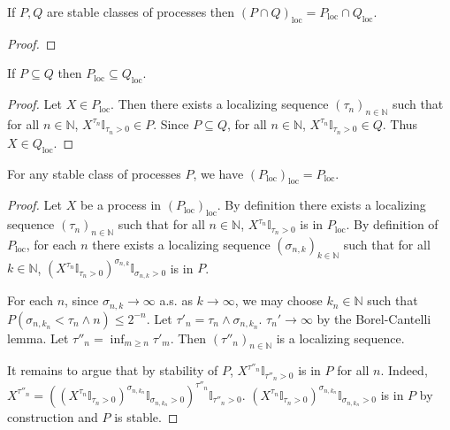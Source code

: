 \begin{lemma}\label{lem:locally_inter}
  \leanok
If $P, Q$ are stable classes of processes then $(P\cap Q)_{\mathrm{loc}} = P_{\mathrm{loc}}\cap Q_{\mathrm{loc}}$.
\end{lemma}

\begin{proof}

\end{proof}


\begin{lemma}\label{lem:locally_mono}
  \leanok
If $P \subseteq Q$ then $P_{\mathrm{loc}} \subseteq Q_{\mathrm{loc}}$.
\end{lemma}

\begin{proof}
Let $X \in P_{\mathrm{loc}}$.
Then there exists a localizing sequence $(\tau_n)_{n \in \mathbb{N}}$ such that for all $n \in \mathbb{N}$, $X^{\tau_n}\mathbb{I}_{\tau_n > 0} \in P$.
Since $P \subseteq Q$, for all $n \in \mathbb{N}$, $X^{\tau_n}\mathbb{I}_{\tau_n > 0} \in Q$.
Thus $X \in Q_{\mathrm{loc}}$.
\end{proof}


\begin{lemma}\label{lem:locally_locally}
  \leanok
For any stable class of processes $P$, we have $(P_{\mathrm{loc}})_{\mathrm{loc}} = P_{\mathrm{loc}}$.
\end{lemma}

\begin{proof}
Let $X$ be a process in $(P_{\mathrm{loc}})_{\mathrm{loc}}$.
By definition there exists a localizing sequence $(\tau_n)_{n \in \mathbb{N}}$ such that for all $n \in \mathbb{N}$, $X^{\tau_n}\mathbb{I}_{\tau_n > 0}$ is in $P_{\mathrm{loc}}$.
By definition of $P_{\mathrm{loc}}$, for each $n$ there exists a localizing sequence $(\sigma_{n,k})_{k \in \mathbb{N}}$ such that for all $k \in \mathbb{N}$, $(X^{\tau_n}\mathbb{I}_{\tau_n > 0})^{\sigma_{n,k}}\mathbb{I}_{\sigma_{n,k} > 0}$ is in $P$.

For each $n$, since $\sigma_{n,k} \to \infty$ a.s. as $k \to \infty$, we may choose $k_n \in \mathbb{N}$ such that $P(\sigma_{n,k_n} < \tau_n \wedge n) \le 2^{-n}$.
Let $\tau'_n = \tau_n \wedge \sigma_{n,k_n}$. $\tau_n' \to \infty$ by the Borel-Cantelli lemma.
Let $\tau''_n = \inf_{m \ge n} \tau'_m$.
Then $(\tau''_n)_{n \in \mathbb{N}}$ is a localizing sequence.

It remains to argue that by stability of $P$, $X^{\tau''_n}\mathbb{I}_{\tau''_n > 0}$ is in $P$ for all $n$.
Indeed, $X^{\tau''_n} = ((X^{\tau_n}\mathbb{I}_{\tau_n > 0})^{\sigma_{n,k_n}}\mathbb{I}_{\sigma_{n,k_n} > 0})^{\tau''_n}\mathbb{I}_{\tau''_n > 0}$. $(X^{\tau_n}\mathbb{I}_{\tau_n > 0})^{\sigma_{n,k_n}}\mathbb{I}_{\sigma_{n,k_n} > 0}$ is in $P$ by construction and $P$ is stable.
\end{proof}


